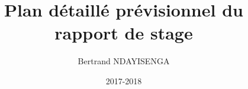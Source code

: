 \documentclass[a4paper,10pt]{report}
\title{Plan détaillé prévisionnel du rapport de stage} \let\Title\@title
\author{Bertrand NDAYISENGA} \let\Author\@author
\date{2017-2018} \let\Date\@date
\begin{document}











 \centering 
 
\end{document}
